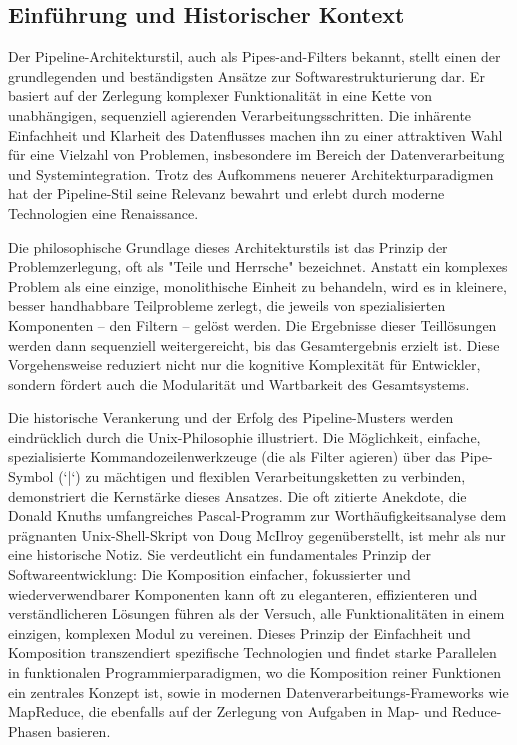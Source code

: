 \documentclass[10pt]{article}
\begin{document}
\begin{multicols}{2}

\section{Einführung und Historischer Kontext}
Der Pipeline-Architekturstil, auch als Pipes-and-Filters bekannt, stellt einen der grundlegenden und beständigsten Ansätze zur Softwarestrukturierung dar. Er basiert auf der Zerlegung komplexer Funktionalität in eine Kette von unabhängigen, sequenziell agierenden Verarbeitungsschritten. Die inhärente Einfachheit und Klarheit des Datenflusses machen ihn zu einer attraktiven Wahl für eine Vielzahl von Problemen, insbesondere im Bereich der Datenverarbeitung und Systemintegration. Trotz des Aufkommens neuerer Architekturparadigmen hat der Pipeline-Stil seine Relevanz bewahrt und erlebt durch moderne Technologien eine Renaissance.

Die philosophische Grundlage dieses Architekturstils ist das Prinzip der Problemzerlegung, oft als "Teile und Herrsche" bezeichnet. Anstatt ein komplexes Problem als eine einzige, monolithische Einheit zu behandeln, wird es in kleinere, besser handhabbare Teilprobleme zerlegt, die jeweils von spezialisierten Komponenten – den Filtern – gelöst werden. Die Ergebnisse dieser Teillösungen werden dann sequenziell weitergereicht, bis das Gesamtergebnis erzielt ist. Diese Vorgehensweise reduziert nicht nur die kognitive Komplexität für Entwickler, sondern fördert auch die Modularität und Wartbarkeit des Gesamtsystems.\cite{richards2020}

Die historische Verankerung und der Erfolg des Pipeline-Musters werden eindrücklich durch die Unix-Philosophie illustriert. Die Möglichkeit, einfache, spezialisierte Kommandozeilenwerkzeuge (die als Filter agieren) über das Pipe-Symbol (`|`) zu mächtigen und flexiblen Verarbeitungsketten zu verbinden, demonstriert die Kernstärke dieses Ansatzes.\cite{richards2020, uqcloud_pipeline, oreilly_python_pipes} Die oft zitierte Anekdote, die Donald Knuths umfangreiches Pascal-Programm zur Worthäufigkeitsanalyse dem prägnanten Unix-Shell-Skript von Doug McIlroy gegenüberstellt, ist mehr als nur eine historische Notiz. Sie verdeutlicht ein fundamentales Prinzip der Softwareentwicklung: Die Komposition einfacher, fokussierter und wiederverwendbarer Komponenten kann oft zu eleganteren, effizienteren und verständlicheren Lösungen führen als der Versuch, alle Funktionalitäten in einem einzigen, komplexen Modul zu vereinen.\cite{richards2020} Dieses Prinzip der Einfachheit und Komposition transzendiert spezifische Technologien und findet starke Parallelen in funktionalen Programmierparadigmen, wo die Komposition reiner Funktionen ein zentrales Konzept ist, sowie in modernen Datenverarbeitungs-Frameworks wie MapReduce, die ebenfalls auf der Zerlegung von Aufgaben in Map- und Reduce-Phasen basieren.\cite{richards2020}


\end{multicols}
\end{document}

